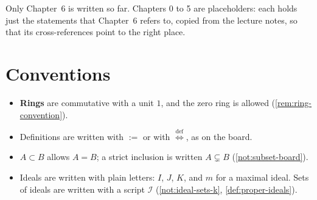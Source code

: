 Only Chapter~6 is written so far. Chapters 0 to 5 are placeholders: each holds just the statements that Chapter~6 refers to, copied from the lecture notes, so that its cross-references point to the right place.

\section*{Conventions}

\begin{itemize}
    \item \textbf{Rings} are commutative with a unit $1$, and the zero ring is allowed (\cref{rem:ring-convention}).
    \item Definitions are written with $:=$ or with $\stackrel{\text{def}}{\iff}$, as on the board.
    \item $A \subset B$ allows $A = B$; a strict inclusion is written $A \subsetneq B$ (\cref{not:subset-board}).
    \item Ideals are written with plain letters: $I$, $J$, $K$, and $m$ for a maximal ideal. Sets of ideals are written with a script $\mathscr{I}$ (\cref{not:ideal-sets-k}, \cref{def:proper-ideals}).
\end{itemize}
